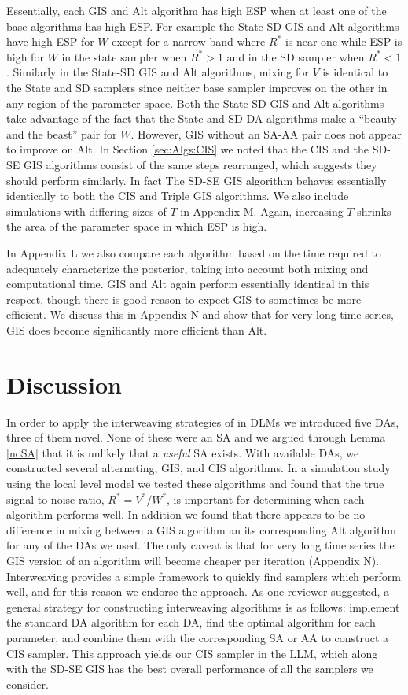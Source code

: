 \documentclass[12pt]{article}
\begin{document}
Essentially, each GIS and Alt algorithm has high ESP when at least one of the base algorithms has high ESP. For example the State-SD GIS and Alt algorithms have high ESP for $W$ except for a narrow band where $R^*$ is near one while ESP is high for $W$ in the state sampler when $R^*>1$ and in the SD sampler when $R^*<1$. Similarly in the State-SD GIS and Alt algorithms, mixing for $V$ is identical to the State and SD samplers since neither base sampler improves on the other in any region of the parameter space. Both the State-SD GIS and Alt algorithms take advantage of the fact that the State and SD DA algorithms make a ``beauty and the beast'' pair for $W$. However, GIS without an SA-AA pair does not appear to improve on Alt. In Section \ref{sec:Algs:CIS} we noted that the CIS and the SD-SE GIS algorithms consist of the same steps rearranged, which suggests they should perform similarly. In fact The SD-SE GIS algorithm behaves essentially identically to both the CIS and Triple GIS algorithms. We also include simulations with differing sizes of $T$ in Appendix M. Again, increasing $T$ shrinks the area of the parameter space in which ESP is high.

In Appendix L we also compare each algorithm based on the time required to adequately characterize the posterior, taking into account both mixing and computational time. GIS and Alt again perform essentially identical in this respect, though there is good reason to expect GIS to sometimes be more efficient. We discuss this in Appendix N and show that for very long time series, GIS does become significantly more efficient than Alt.


\section{Discussion}\label{sec:Discuss}
In order to apply the interweaving strategies of \citet{yu2011center} in DLMs we introduced five DAs, three of them novel. None of these were an SA and we argued through Lemma \ref{noSA} that it is unlikely that a {\it useful} SA exists. With available DAs, we constructed several alternating, GIS, and CIS algorithms. In a simulation study using the local level model we tested these algorithms and found that the true signal-to-noise ratio, $R^*=V^*/W^*$, is important for determining when each algorithm performs well. In addition we found that there appears to be no difference in mixing between a GIS algorithm an its corresponding Alt algorithm for any of the DAs we used. The only caveat is that for very long time series the GIS version of an algorithm will become cheaper per iteration (Appendix N). Interweaving provides a simple framework to quickly find samplers which perform well, and for this reason we endorse the approach. As one reviewer suggested, a general strategy for constructing interweaving algorithms is as follows: implement the standard DA algorithm for each DA, find the optimal algorithm for each parameter, and combine them with the corresponding SA or AA to construct a CIS sampler. This approach yields our CIS sampler in the LLM, which along with the SD-SE GIS has the best overall performance of all the samplers we consider.
\end{document}
